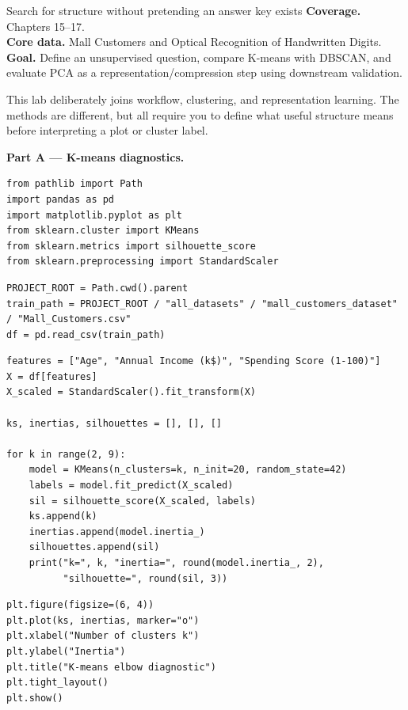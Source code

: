 
\begin{labproject}{Search for structure without pretending an answer key exists}
\textbf{Coverage.} Chapters 15--17.\\
\textbf{Core data.} Mall Customers and Optical Recognition of Handwritten Digits.\\
\textbf{Goal.} Define an unsupervised question, compare K-means with DBSCAN, and evaluate PCA as a representation/compression step using downstream validation.

\begin{labmode}
This lab deliberately joins workflow, clustering, and representation learning. The methods are different, but all require you to define what useful structure means before interpreting a plot or cluster label.
\end{labmode}

\medskip\noindent\textbf{Part A --- K-means diagnostics.}\par
\begin{lstlisting}[style=mlpython]
from pathlib import Path
import pandas as pd
import matplotlib.pyplot as plt
from sklearn.cluster import KMeans
from sklearn.metrics import silhouette_score
from sklearn.preprocessing import StandardScaler
\end{lstlisting}

\begin{lstlisting}[style=mlpython]
PROJECT_ROOT = Path.cwd().parent
train_path = PROJECT_ROOT / "all_datasets" / "mall_customers_dataset" / "Mall_Customers.csv"
df = pd.read_csv(train_path)
\end{lstlisting}

\begin{lstlisting}[style=mlpython]
features = ["Age", "Annual Income (k$)", "Spending Score (1-100)"]
X = df[features]
X_scaled = StandardScaler().fit_transform(X)

ks, inertias, silhouettes = [], [], []

for k in range(2, 9):
    model = KMeans(n_clusters=k, n_init=20, random_state=42)
    labels = model.fit_predict(X_scaled)
    sil = silhouette_score(X_scaled, labels)
    ks.append(k)
    inertias.append(model.inertia_)
    silhouettes.append(sil)
    print("k=", k, "inertia=", round(model.inertia_, 2),
          "silhouette=", round(sil, 3))
\end{lstlisting}

\begin{lstlisting}[style=mlpython]
plt.figure(figsize=(6, 4))
plt.plot(ks, inertias, marker="o")
plt.xlabel("Number of clusters k")
plt.ylabel("Inertia")
plt.title("K-means elbow diagnostic")
plt.tight_layout()
plt.show()
\end{lstlisting}


\end{labproject}
